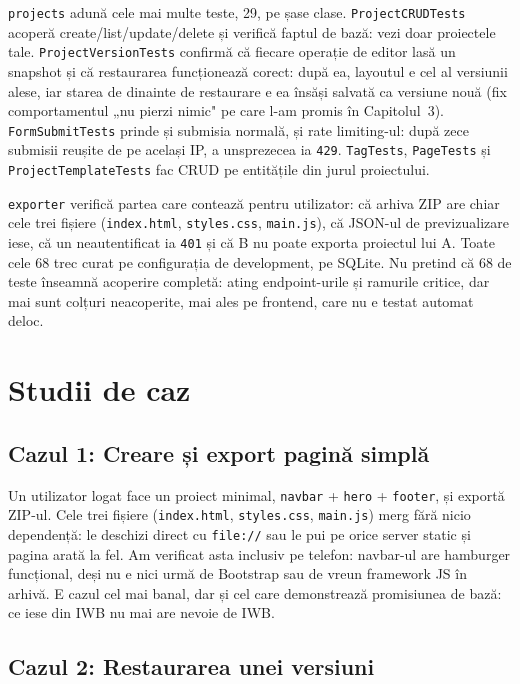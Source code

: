 \documentclass[12pt,a4paper]{report}
\begin{document}
\texttt{projects} adună cele mai multe teste, 29, pe șase clase. \texttt{ProjectCRUDTests}
acoperă create/list/update/delete și verifică faptul de bază: vezi doar proiectele
tale. \texttt{ProjectVersionTests} confirmă că fiecare operație de editor lasă un
snapshot și că restaurarea funcționează corect: după ea, layoutul e cel al versiunii
alese, iar starea de dinainte de restaurare e ea însăși salvată ca versiune nouă (fix
comportamentul „nu pierzi nimic" pe care l-am promis în Capitolul~3).
\texttt{FormSubmitTests} prinde și submisia normală, și rate limiting-ul: după zece
submisii reușite de pe același IP, a unsprezecea ia \texttt{429}. \texttt{TagTests},
\texttt{PageTests} și \texttt{ProjectTemplateTests} fac CRUD pe entitățile din jurul
proiectului.

\texttt{exporter} verifică partea care contează pentru utilizator: că arhiva ZIP are
chiar cele trei fișiere (\texttt{index.html}, \texttt{styles.css}, \texttt{main.js}),
că JSON-ul de previzualizare iese, că un neautentificat ia \texttt{401} și că B nu
poate exporta proiectul lui A. Toate cele 68 trec curat pe configurația de development,
pe SQLite. Nu pretind că 68 de teste înseamnă acoperire completă: ating endpoint-urile
și ramurile critice, dar mai sunt colțuri neacoperite, mai ales pe frontend, care nu e
testat automat deloc.

\section{Studii de caz}

\subsection{Cazul 1: Creare și export pagină simplă}

Un utilizator logat face un proiect minimal, \texttt{navbar} + \texttt{hero} +
\texttt{footer}, și exportă ZIP-ul. Cele trei fișiere (\texttt{index.html},
\texttt{styles.css}, \texttt{main.js}) merg fără nicio dependență: le deschizi direct
cu \texttt{file://} sau le pui pe orice server static și pagina arată la fel. Am
verificat asta inclusiv pe telefon: navbar-ul are hamburger funcțional, deși nu e
nici urmă de Bootstrap sau de vreun framework JS în arhivă. E cazul cel mai banal, dar
și cel care demonstrează promisiunea de bază: ce iese din IWB nu mai are nevoie de IWB.

\subsection{Cazul 2: Restaurarea unei versiuni}
\end{document}
